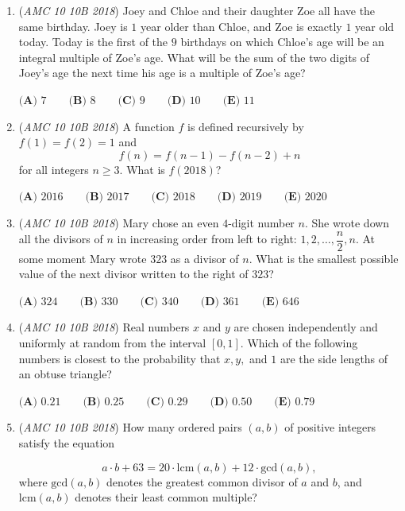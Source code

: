 \begin{enumerate}
 $\textbf{(A) }60 \qquad \textbf{(B) }72 \qquad \textbf{(C) }92 \qquad \textbf{(D) }96 \qquad \textbf{(E) }120 \qquad$


	\item (\textit{AMC 10 10B 2018}) Joey and Chloe and their daughter Zoe all have the same birthday. Joey is $1$ year older than Chloe, and Zoe is exactly $1$ year old today. Today is the first of the $9$ birthdays on which Chloe's age will be an integral multiple of Zoe's age. What will be the sum of the two digits of Joey's age the next time his age is a multiple of Zoe's age?


 $\textbf{(A) }7 \qquad \textbf{(B) }8 \qquad \textbf{(C) }9 \qquad \textbf{(D) }10 \qquad \textbf{(E) }11 \qquad$


	\item (\textit{AMC 10 10B 2018}) A function $f$ is defined recursively by $f(1)=f(2)=1$ and 
 \[f(n)=f(n-1)-f(n-2)+n\]for all integers $n \geq 3$. What is $f(2018)$?


 $\textbf{(A) } 2016 \qquad \textbf{(B) } 2017 \qquad \textbf{(C) } 2018 \qquad \textbf{(D) } 2019 \qquad \textbf{(E) } 2020$


	\item (\textit{AMC 10 10B 2018}) Mary chose an even $4$-digit number $n$. She wrote down all the divisors of $n$ in increasing order from left to right: $1,2,\ldots,\dfrac{n}{2},n$. At some moment Mary wrote $323$ as a divisor of $n$. What is the smallest possible value of the next divisor written to the right of $323$?


 $\textbf{(A) }324 \qquad \textbf{(B) }330 \qquad \textbf{(C) }340 \qquad \textbf{(D) }361 \qquad \textbf{(E) }646 \qquad$


	\item (\textit{AMC 10 10B 2018}) Real numbers $x$ and $y$ are chosen independently and uniformly at random from the interval $[0,1]$. Which of the following numbers is closest to the probability that $x,y,$ and $1$ are the side lengths of an obtuse triangle?


 $\textbf{(A) }0.21 \qquad \textbf{(B) }0.25 \qquad \textbf{(C) }0.29 \qquad \textbf{(D) }0.50 \qquad \textbf{(E) }0.79 \qquad$


	\item (\textit{AMC 10 10B 2018}) How many ordered pairs $(a, b)$ of positive integers satisfy the equation 

 \[a\cdot b + 63 = 20\cdot \text{lcm}(a, b) + 12\cdot\text{gcd}(a,b),\]
where $\text{gcd}(a,b)$ denotes the greatest common divisor of $a$ and $b$, and $\text{lcm}(a,b)$ denotes their least common multiple?



\end{enumerate}
